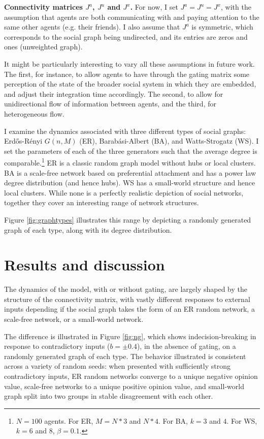 \documentclass[]{article}
\begin{document}
\textbf{Connectivity matrices $J^a$, $J^u$ and $J^x$.} For now, I set $J^a = J^u = J^x$, with the assumption that agents are both communicating with and paying attention to the same other agents (e.g. their friends). I also assume that $J^a$ is symmetric, which corresponds to the social graph being undirected, and its entries are zeros and ones (unweighted graph).

It might be particularly interesting to vary all these assumptions in future work. The first, for instance, to allow agents to have through the gating matrix some perception of the state of the broader social system in which they are embedded, and adjust their integration time accordingly. The second, to allow for unidirectional flow of information between agents, and the third, for heterogeneous flow.

I examine the dynamics associated with three different types of social graphs: Erdős-Rényi $G(n, M)$ (ER), Barabási-Albert (BA), and Watts-Strogatz (WS). I set the parameters of each of the three generators such that the average degree is comparable.\footnote{$N = 100$ agents. For ER, $M = N*3$ and $N*4$. For BA, $k = 3$ and $4$. For WS, $k = 6$ and $8$, $\beta = 0.1$.} ER is a classic random graph model without hubs or local clusters. BA is a scale-free network based on preferential attachment and has a power law degree distribution (and hence hubs). WS has a small-world structure and hence local clusters. While none is a perfectly realistic depiction of social networks, together they cover an interesting range of network structures.

Figure \ref{fig:graphtypes} illustrates this range by depicting a randomly generated graph of each type, along with its degree distribution.

\section{Results and discussion}

The dynamics of the model, with or without gating, are largely shaped by the structure of the connectivity matrix, with vastly different responses to external inputs depending if the social graph takes the form of an ER random network, a scale-free network, or a small-world network. 

The difference is illustrated in Figure \ref{fig:ng}, which shows indecision-breaking in response to contradictory inputs ($b = \pm 0.4$), in the absence of gating, on a randomly generated graph of each type. The behavior illustrated is consistent across a variety of random seeds: when presented with sufficiently strong contradictory inputs, ER random networks converge to a unique negative opinion value, scale-free networks to a unique positive opinion value, and small-world graph split into two groups in stable disagreement with each other. 
\end{document}
